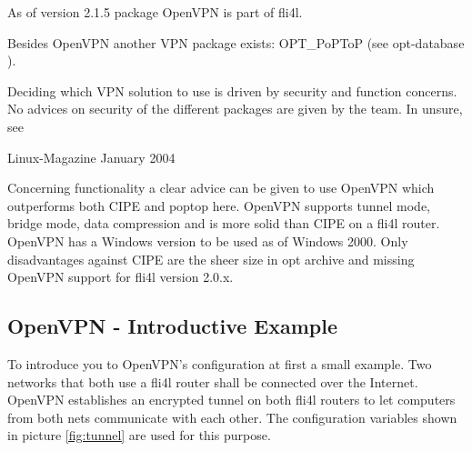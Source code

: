 
\sloppy

As of version 2.1.5 package OpenVPN is part of fli4l.


Besides OpenVPN another VPN package exists: OPT\_PoPToP
(see opt-database ).

Deciding which VPN solution to use is driven by security and function 
concerns. No advices on security of the different packages are given 
by the team. In unsure, see

Linux-Magazine January 2004



Concerning functionality a clear advice can be given to use 
OpenVPN which outperforms both CIPE and poptop here. OpenVPN 
supports tunnel mode, bridge mode, data compression and is more solid 
than CIPE on a fli4l router. OpenVPN has a Windows version to be used 
as of Windows 2000. Only disadvantages against CIPE are the sheer size 
in opt archive and missing OpenVPN support for fli4l version 2.0.x.

\subsection{OpenVPN - Introductive Example}

To introduce you to OpenVPN's configuration at first a small example. 
Two networks that both use a fli4l router shall be connected over the 
Internet. OpenVPN establishes an encrypted tunnel on both fli4l routers 
to let computers from both nets communicate with each other. The configuration 
variables shown in picture \ref{fig:tunnel} are used for this purpose.

